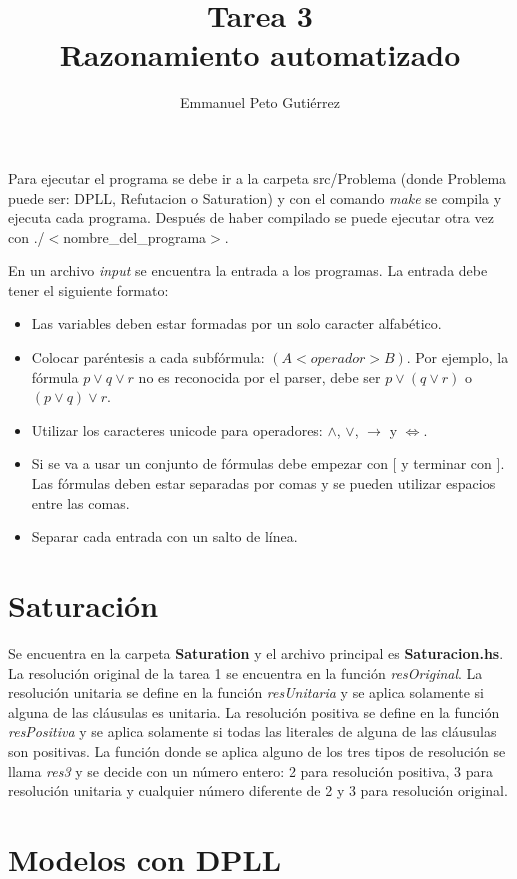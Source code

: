 \documentclass{article}
\author{Emmanuel Peto Gutiérrez}
\title{Tarea 3\\Razonamiento automatizado}
\begin{document}
\maketitle

Para ejecutar el programa se debe ir a la carpeta src/Problema (donde Problema puede ser: DPLL, Refutacion o
 Saturation) y con el comando \textit{make} se compila y ejecuta cada programa. Después de haber compilado se
 puede ejecutar otra vez con ./$<$nombre\_del\_programa$>$.

En un archivo \textit{input} se encuentra la entrada a los programas. La entrada debe tener el siguiente formato:
\begin{itemize}
\item Las variables deben estar formadas por un solo caracter alfabético.
\item Colocar paréntesis a cada subfórmula: $(A <operador> B)$. Por ejemplo, la fórmula $p \vee q \vee r$ no es reconocida por el parser, debe ser $p \vee (q \vee r)$ o $(p \vee q) \vee r$.
\item Utilizar los caracteres unicode para operadores: $\wedge$, $\vee$, $\rightarrow$ y $\Leftrightarrow$.
\item Si se va a usar un conjunto de fórmulas debe empezar con [ y terminar con ]. Las fórmulas deben estar separadas por comas y se pueden utilizar espacios entre las comas.
\item Separar cada entrada con un salto de línea.
\end{itemize}

\section{Saturación}

Se encuentra en la carpeta \textbf{Saturation} y el archivo principal es \textbf{Saturacion.hs}. La resolución original de la tarea 1 se encuentra en la función \textit{resOriginal}. La resolución unitaria se define en la función \textit{resUnitaria} y se aplica solamente si alguna de las cláusulas es unitaria. La resolución positiva se define en la función \textit{resPositiva} y se aplica solamente si todas las literales de alguna de las cláusulas son positivas. La función donde se aplica alguno de los tres tipos de resolución se llama \textit{res3} y se decide con un número entero: 2 para resolución positiva, 3 para resolución unitaria y cualquier número diferente de 2 y 3 para resolución original.

\section{Modelos con DPLL}
\end{document}
